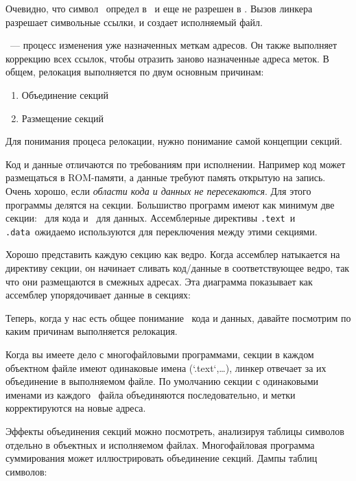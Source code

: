 Очевидно, что символ \ определ в \ и еще не разрешен
в . Вызов линкера разрешает символьные ссылки, и создает
исполняемый файл.
 
\secdown

\ --- процесс изменения уже назначенных
меткам адресов.
Он также выполняет коррекцию всех ссылок, чтобы отразить заново назначенные
адреса меток. В общем, релокация выполняется по двум основным причинам:

\begin{enumerate}[nosep]
\item Объединение секций
\item Размещение секций
\end{enumerate}

Для понимания процеса релокации, нужно понимание самой концепции секций.

Код и данные отличаются по требованиям при исполнении. Например код может
размещаться в ROM-памяти, а данные требуют память открытую на запись. Очень
хорошо, если \emph{области кода и данных не пересекаются}. Для этого программы
делятся на секции. Большиство программ имеют как минимум две секции:
\ для кода и \ для данных. Ассемблерные директивы
\verb|.text|\ и \verb|.data|\ ожидаемо используются для переключения между этими
секциями.

Хорошо представить каждую секцию как ведро. Когда ассемблер натыкается на 
директиву секции, он начинает сливать код/данные в соответствующее ведро, так 
что они размещаются в смежных адресах. Эта диаграмма показывает как ассемблер
упорядочивает данные в секциях:


Теперь, когда у нас есть общее понимание
\ кода и данных, давайте посмотрим по
каким причинам выполняется релокация.


Когда вы имеете дело с многофайловыми программами, секции в каждом объектном
файле имеют одинаковые имена (`.text`,\ldots), линкер отвечает за их объединение
в выполняемом файле. По умолчанию секции с одинаковыми именами из каждого
\ файла объединяются последовательно, и метки корректируются на новые
адреса.

Эффекты объединения секций можно посмотреть, анализируя таблицы символов
отдельно в объектных и исполняемом файлах. Многофайловая программа суммирования
может иллюстрировать объединение секций. Дампы таблиц символов:

